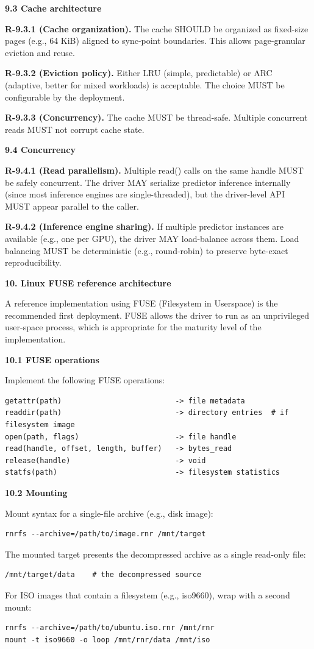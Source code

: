 \documentclass[
]{article}
\begin{document}
\textbf{9.3 Cache architecture}

\textbf{R-9.3.1 (Cache organization).} The cache SHOULD be organized as
fixed-size pages (e.g., 64 KiB) aligned to sync-point boundaries. This
allows page-granular eviction and reuse.

\textbf{R-9.3.2 (Eviction policy).} Either LRU (simple, predictable) or
ARC (adaptive, better for mixed workloads) is acceptable. The choice
MUST be configurable by the deployment.

\textbf{R-9.3.3 (Concurrency).} The cache MUST be thread-safe. Multiple
concurrent reads MUST not corrupt cache state.

\textbf{9.4 Concurrency}

\textbf{R-9.4.1 (Read parallelism).} Multiple read() calls on the same
handle MUST be safely concurrent. The driver MAY serialize predictor
inference internally (since most inference engines are single-threaded),
but the driver-level API MUST appear parallel to the caller.

\textbf{R-9.4.2 (Inference engine sharing).} If multiple predictor
instances are available (e.g., one per GPU), the driver MAY load-balance
across them. Load balancing MUST be deterministic (e.g., round-robin) to
preserve byte-exact reproducibility.

\textbf{10. Linux FUSE reference architecture}

A reference implementation using FUSE (Filesystem in Userspace) is the
recommended first deployment. FUSE allows the driver to run as an
unprivileged user-space process, which is appropriate for the maturity
level of the implementation.

\textbf{10.1 FUSE operations}

Implement the following FUSE operations:
\begin{verbatim}
getattr(path)                          -> file metadata
readdir(path)                          -> directory entries  # if filesystem image
open(path, flags)                      -> file handle
read(handle, offset, length, buffer)   -> bytes_read
release(handle)                        -> void
statfs(path)                           -> filesystem statistics
\end{verbatim}

\textbf{10.2 Mounting}

Mount syntax for a single-file archive (e.g., disk image):
\begin{verbatim}
rnrfs --archive=/path/to/image.rnr /mnt/target
\end{verbatim}
The mounted target presents the decompressed archive as a single
read-only file:
\begin{verbatim}
/mnt/target/data    # the decompressed source
\end{verbatim}
For ISO images that contain a filesystem (e.g., iso9660), wrap with a
second mount:
\begin{verbatim}
rnrfs --archive=/path/to/ubuntu.iso.rnr /mnt/rnr
mount -t iso9660 -o loop /mnt/rnr/data /mnt/iso
\end{verbatim}
\end{document}

